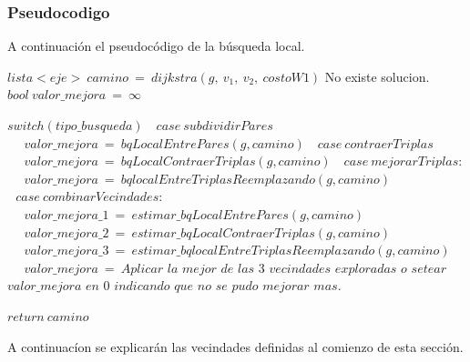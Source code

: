 \subsubsection{Pseudocodigo}

A continuaci\'on el pseudoc\'odigo de la b\'usqueda local.
\begin{algorithmic}


 \State $lista<eje> \: camino\: =\: dijkstra(g, \:v_1,\: v_2, \:costoW1)$
 \State No existe solucion.
 \EndIf
 \State  $bool\: valor\_mejora\: = \:\infty$


  \State $switch(tipo\_busqueda)$
	\State$\: \: \: 	case\: subdividirPares$
		\State$\: \: \: \: \: 	\:valor\_mejora\: = \: bqLocalEntrePares(g,camino)$
	\State$	\: \: \: case\: contraerTriplas$		
		\State$\: \: \: \: \: 	\:valor\_mejora\: = \: bqLocalContraerTriplas(g,camino)$
	\State$	\: \: \: case \:mejorarTriplas:		$
		\State$\: \: \: \: \: 	\:valor\_mejora\: = \: bqlocalEntreTriplasReemplazando(g,camino)$
	\State$	\: \: \: case \:combinarVecindades:		$
		\State$\: \: \: \: \: 	\:valor\_mejora\_1\: = \: estimar\_bqLocalEntrePares(g,camino)$
		\State$\: \: \: \: \: 	\:valor\_mejora\_2\: = \: estimar\_bqLocalContraerTriplas(g,camino)$
		\State$\: \: \: \: \: 	\:valor\_mejora\_3\: = \: estimar\_bqlocalEntreTriplasReemplazando(g,camino)$
		\State$\: \: \: \: \: 	\:valor\_mejora\: = \: Aplicar$ $la$ $mejor$ $de$ $las$ $3$ $vecindades$ $exploradas$ $o$ $setear$ $valor\_mejora$ $en$ $0$ $indicando$ $que$ $no$ $se$ $pudo$ $mejorar$ $mas$.


\EndWhile

 \State $return \:camino$

 \EndProcedure

\end{algorithmic}

A continuac\'ion se explicar\'an las vecindades definidas al comienzo de esta secci\'on.

